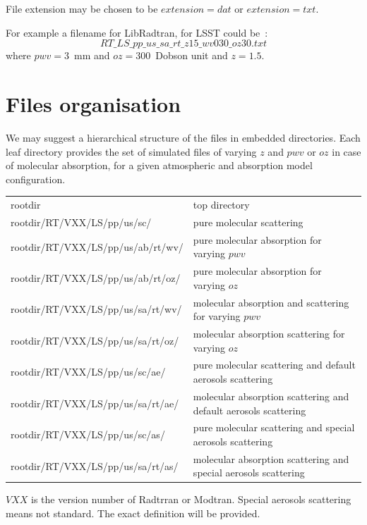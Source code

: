 \documentclass[a4paper]{article}
\begin{document}
File extension may be chosen to be $extension=dat$ or $extension=txt$.

For example a filename for LibRadtran, for LSST could be~:
\begin{equation}
RT\_LS\_pp\_us\_sa\_rt\_z15\_wv030\_oz30.txt  \nonumber
\end{equation}
where $pwv=3$~mm and $oz=300$~Dobson unit and $z=1.5$.


\section{Files organisation}
We may suggest a hierarchical structure  of the files in embedded directories.
Each leaf directory provides the set of simulated files of varying $z$ and $pwv$ or $oz$ in case of molecular absorption, for a given atmospheric and absorption model configuration.

\begin{table}[h]
{\small
\begin{tabular}{ l l}
  rootdir &  top directory \\
 rootdir/RT/VXX/LS/pp/us/sc/ & pure molecular scattering \\
 rootdir/RT/VXX/LS/pp/us/ab/rt/wv/ & pure molecular absorption for varying $pwv$ \\
 rootdir/RT/VXX/LS/pp/us/ab/rt/oz/ & pure molecular absorption for varying $oz$ \\
 rootdir/RT/VXX/LS/pp/us/sa/rt/wv/ & molecular absorption and scattering for varying $pwv$ \\
 rootdir/RT/VXX/LS/pp/us/sa/rt/oz/ & molecular absorption scattering for varying $oz$ \\
 rootdir/RT/VXX/LS/pp/us/sc/ae/ & pure molecular scattering and default aerosols scattering \\
 rootdir/RT/VXX/LS/pp/us/sa/rt/ae/ & molecular absorption scattering and default aerosols scattering \\
 rootdir/RT/VXX/LS/pp/us/sc/as/ & pure molecular scattering and special aerosols scattering \\
 rootdir/RT/VXX/LS/pp/us/sa/rt/as/ & molecular absorption scattering and special aerosols scattering \\
\end{tabular}
}
\end{table}
$VXX$ is the version number of Radtrran or Modtran.
Special aerosols scattering means not standard. The exact definition will be provided.
\end{document}
